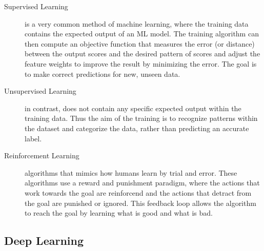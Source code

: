 \begin{description}
\item[Supervised Learning] is a very common method of machine learning, where the training data contains the expected output of an ML model. The training algorithm can then compute an objective function that measures the error (or distance) between the output scores and the desired pattern of scores \citep{deeplearning} and adjust the feature weights to improve the result by minimizing the error. The goal is to make correct predictions for new, unseen data.

\item[Unsupervised Learning] in contrast, does not contain any specific expected output within the training data. Thus the aim of the training is to recognize patterns within the dataset and categorize the data, rather than predicting an accurate label.

\item[Reinforcement Learning] algorithms that mimics how humans learn by trial and error. These algorithms use a reward and punishment paradigm, where the actions that work towards the goal are reinforcend and the actions that detract from the goal are punished or ignored. This feedback loop allows the algorithm to reach the goal by learning what is good and what is bad.

\end{description}


\subsection{Deep Learning}







